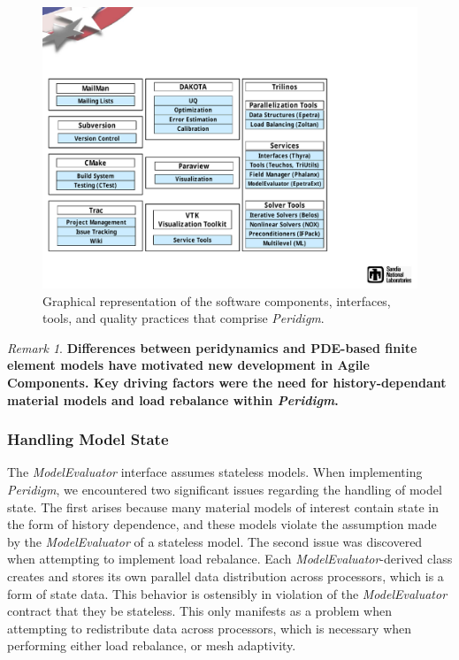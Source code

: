 \documentclass[pdf,ps2pdf,12pt,report]{SANDreport}
\theoremstyle{plain}
\theoremstyle{definition}
\theoremstyle{remark}
\newtheorem{rem}{Remark}[section]
\numberwithin{equation}{section}
\begin{document}
\begin{figure}[h!]
\begin{center}
	\includegraphics[width=\linewidth]{PeridigmComponents}
 \end{center}
 \caption{Graphical representation of the software components, interfaces, tools, and quality practices that comprise \emph{Peridigm}.}
\label{fig:PeridigmComponents}
\end{figure}

\begin{rem}
\textbf{Differences between peridynamics and PDE-based finite element models have motivated new development in Agile Components. Key driving factors were the need for history-dependant material models and load rebalance within \emph{Peridigm}.}
\end{rem}

\subsubsection{Handling Model State}

The \emph{ModelEvaluator} interface assumes stateless models. When implementing \emph{Peridigm}, we encountered two significant issues regarding the handling of model state. The first arises because many material models of interest contain state in the form of history dependence, and these models violate the assumption made by the \emph{ModelEvaluator} of a stateless model. The second issue was discovered when attempting to implement load rebalance. Each \emph{ModelEvaluator}-derived class creates and stores its own parallel data distribution across processors, which is a form of state data. This behavior is ostensibly in violation of the \emph{ModelEvaluator} contract that they be stateless. This only manifests as a problem when attempting to redistribute data across processors, which is necessary when performing either load rebalance, or mesh adaptivity.
\end{document}
